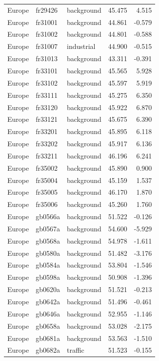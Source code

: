 \documentclass{article}
\begin{document}
\begin{longtable}{lllrr}
Europe & fr29426 & background & 45.475 & 4.515 \\ 
Europe & fr31001 & background & 44.861 & -0.579 \\ 
Europe & fr31002 & background & 44.801 & -0.588 \\ 
Europe & fr31007 & industrial & 44.900 & -0.515 \\ 
Europe & fr31013 & background & 43.311 & -0.391 \\ 
Europe & fr33101 & background & 45.565 & 5.928 \\ 
Europe & fr33102 & background & 45.597 & 5.919 \\ 
Europe & fr33111 & background & 45.275 & 6.350 \\ 
Europe & fr33120 & background & 45.922 & 6.870 \\ 
Europe & fr33121 & background & 45.675 & 6.390 \\ 
Europe & fr33201 & background & 45.895 & 6.118 \\ 
Europe & fr33202 & background & 45.917 & 6.136 \\ 
Europe & fr33211 & background & 46.196 & 6.241 \\ 
Europe & fr35002 & background & 45.890 & 0.900 \\ 
Europe & fr35004 & background & 45.159 & 1.537 \\ 
Europe & fr35005 & background & 46.170 & 1.870 \\ 
Europe & fr35006 & background & 45.260 & 1.760 \\ 
Europe & gb0566a & background & 51.522 & -0.126 \\ 
Europe & gb0567a & background & 54.600 & -5.929 \\ 
Europe & gb0568a & background & 54.978 & -1.611 \\ 
Europe & gb0580a & background & 51.482 & -3.176 \\ 
Europe & gb0584a & background & 53.804 & -1.546 \\ 
Europe & gb0598a & background & 50.908 & -1.396 \\ 
Europe & gb0620a & background & 51.521 & -0.213 \\ 
Europe & gb0642a & background & 51.496 & -0.461 \\ 
Europe & gb0646a & background & 52.955 & -1.146 \\ 
Europe & gb0658a & background & 53.028 & -2.175 \\ 
Europe & gb0681a & background & 53.563 & -1.510 \\ 
Europe & gb0682a & traffic & 51.523 & -0.155 \\ 

\end{longtable}
\end{document}
